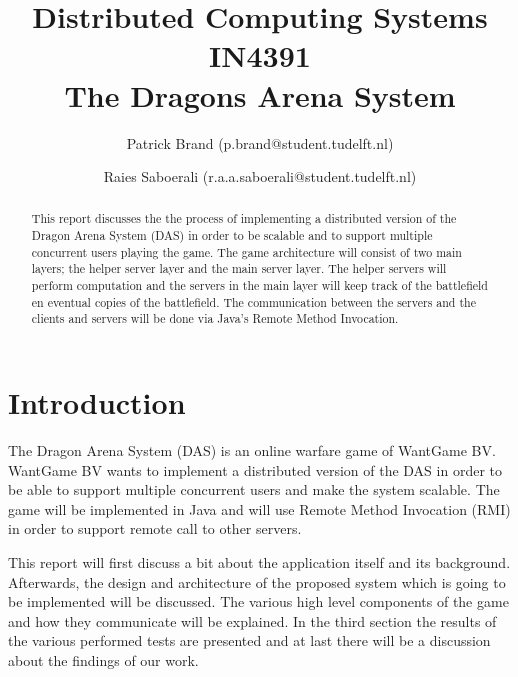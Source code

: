 \documentclass{article}
\title{Distributed Computing Systems IN4391\\ The Dragons Arena System %
}
\author{Patrick Brand (p.brand@student.tudelft.nl) \and
    Raies Saboerali (r.a.a.saboerali@student.tudelft.nl)
}
\date{}
\begin{document}
\maketitle
\thispagestyle{empty}

\begin{abstract}
This report discusses the the process of implementing a distributed version of the Dragon Arena System (DAS) in order to be scalable and to support multiple concurrent users playing the game.
The game architecture will consist of two main layers; the helper server layer and the main server layer.
The helper servers will perform computation and the servers in the main layer will keep track of the battlefield en eventual copies of the battlefield.
The communication between the servers and the clients and servers will be done via Java's Remote Method Invocation.
\end{abstract}


\section{Introduction}

The Dragon Arena System (DAS) is an online warfare game of WantGame BV.
WantGame BV wants to implement a distributed version of the DAS in order to be able to support multiple concurrent users and make the system scalable.
The game will be implemented in Java and will use Remote Method Invocation (RMI) in order to support remote call to other servers.

This report will first discuss a bit about the application itself and its background.
Afterwards, the design and architecture of the proposed system which is going to be implemented will be discussed. 
The various high level components of the game and how they communicate will be explained.
In the third section the results of the various performed tests are presented and at last there will be a discussion about the findings of our work.

\newpage









  



\nocite{*}


\end{document}
